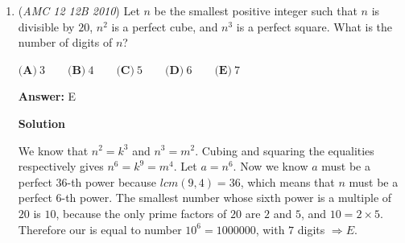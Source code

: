 \begin{enumerate}
 Also, since $2a-1$ is the rank of the last-place person, and one of Andrea's teammates already got 64th place, $2a-1 > 64 \implies a \ge 33$.

 Putting it all together: $33 \le a < 37$ and $a \equiv 2 \pmod{3}$, so clearly $a = 35$, and the number of schools as we got before is $(2a-1)/3 = 69/3 = \boxed{\mathbf{(B)}\ 23}$.

 



\textbf{Solution 3}

Since all students have distinct scores, we can assume the scores are $1$ through $S$, where $S$ is the total number of students. From Solution 1, we know that $S$ is odd.

 Andrea’s score is the median, so$A = \frac{S+1}{2}$.Beth and Carla have scores$B = S - 37$, $\quad C = S - 64$.Since Andrea has the highest score among her teammates, we have$A > B \quad \text{and} \quad A > C$.Thus, $\frac{S+1}{2} > S - 37 \quad \text{and} \quad \frac{S+1}{2} > S - 64$.

 Solving these inequalities:$\frac{S+1}{2} > S - 37 \Rightarrow S < 75$,$\frac{S+1}{2} > S - 64 \Rightarrow S < 129$.Hence, $S < 75$.We also have : $B + C > A$.Substituting:$(S - 37) + (S - 64) > \frac{S+1}{2}$.This simplifies to$2S - 101 > \frac{S+1}{2}$$\Rightarrow 4S - 202 > S + 1$$\Rightarrow 3S > 203$$\Rightarrow S > \frac{203}{3}$.

 Since students are grouped into teams of 3, let$S = 3t$.Then$\frac{203}{3} < S < 75$.$\Rightarrow 22 < t < 25$Because t has to be an odd number in this range we get :$t = 23$.

 $\boxed{\mathbf{(B)\ 23}}$



	\item (\textit{AMC 12 12B 2010}) Let $n$ be the smallest positive integer such that $n$ is divisible by $20$, $n^2$ is a perfect cube, and $n^3$ is a perfect square. What is the number of digits of $n$?


 $\textbf{(A)}\ 3 \qquad \textbf{(B)}\ 4 \qquad \textbf{(C)}\ 5 \qquad \textbf{(D)}\ 6 \qquad \textbf{(E)}\ 7$

 \textbf{Answer: }E



\textbf{Solution}

We know that $n^2 = k^3$ and $n^3 = m^2$. Cubing and squaring the equalities respectively gives $n^6 = k^9 = m^4$. Let $a = n^6$. Now we know $a$ must be a perfect $36$-th power because $lcm(9,4) = 36$, which means that $n$ must be a perfect $6$-th power. The smallest number whose sixth power is a multiple of $20$ is $10$, because the only prime factors of $20$ are $2$ and $5$, and $10 = 2 \times 5$. Therefore our is equal to number $10^6 = 1000000$, with $7$ digits $\Rightarrow \boxed {E}$.


\end{enumerate}
